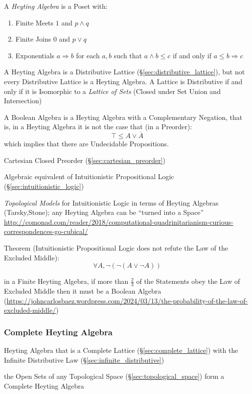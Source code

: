 A \emph{Heyting Algebra} is a Poset with:
\begin{enumerate}
  \item Finite Meets $1$ and $p \wedge q$
  \item Finite Joins $0$ and $p \vee q$
  \item Exponentials $a \Rightarrow b$ for each $a,b$ such that $a
    \wedge b \leq c$ if and only if $a \leq b \Rightarrow c$
\end{enumerate}
A Heyting Algebra is a Distributive Lattice (\S\ref{sec:distributive_lattice}),
but not every Distributive Lattice is a Heyting Algebra. A Lattice is
Distributive if and only if it is Isomorphic to a \emph{Lattice of Sets} (Closed
under Set Union and Intersection)

A Boolean Algebra is a Heyting Algebra with a Complementary Negation,
that is, in a Heyting Algebra it is not the case that (in a Preorder):
\[
  \top \leq A \vee \overline{A}
\]
which implies that there are Undecidable Propositions.

Cartesian Closed Preorder (\S\ref{sec:cartesian_preorder})

Algebraic equivalent of Intuitionistic Propositional Logic
(\S\ref{sec:intuitionistic_logic})

\emph{Topological Models} for Intuitionistic Logic in terms of Heyting Algebras
(Tarsky,Stone); any Heyting Algebra can be ``turned into a Space''
\url{http://comonad.com/reader/2018/computational-quadrinitarianism-curious-correspondences-go-cubical/}

Theorem (Intuitionistic Propositional Logic does not refute the Law of
the Excluded Middle)\cite{harper12}:
\[
  \forall A, \neg (\neg (A \vee \neg A))
\]

in a Finite Heyting Algebra, if more than $\frac{2}{3}$ of the Statements obey
the Law of Excluded Middle then it must be a Boolean Algebra
(\url{https://johncarlosbaez.wordpress.com/2024/03/13/the-probability-of-the-law-of-excluded-middle/})



\subsubsection{Complete Heyting Algebra}\label{sec:complete_heyting_algebra}

Heyting Algebra that is a Complete Lattice
(\S\ref{sec:complete_lattice}) with the Infinite Distributive Law
(\S\ref{sec:infinite_distributive})

the Open Sets of any Topological Space (\S\ref{sec:topological_space}) form a
Complete Heyting Algebra

